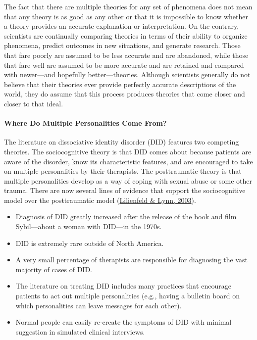 \documentclass[
]{krantz}
\providecommand{\tightlist}{%
  \setlength{\itemsep}{0pt}\setlength{\parskip}{0pt}}
\begin{document}
The fact that there are multiple theories for any set of phenomena does not mean that any theory is as good as any other or that it is impossible to know whether a theory provides an accurate explanation or interpretation. On the contrary, scientists are continually comparing theories in terms of their ability to organize phenomena, predict outcomes in new situations, and generate research. Those that fare poorly are assumed to be less accurate and are abandoned, while those that fare well are assumed to be more accurate and are retained and compared with newer---and hopefully better---theories. Although scientists generally do not believe that their theories ever provide perfectly accurate descriptions of the world, they do assume that this process produces theories that come closer and closer to that ideal.

\hypertarget{where-do-multiple-personalities-come-from}{%
\paragraph*{Where Do Multiple Personalities Come From?}\label{where-do-multiple-personalities-come-from}}

The literature on dissociative identity disorder (DID) features two competing theories. The sociocognitive theory is that DID comes about because patients are aware of the disorder, know its characteristic features, and are encouraged to take on multiple personalities by their therapists. The posttraumatic theory is that multiple personalities develop as a way of coping with sexual abuse or some other trauma. There are now several lines of evidence that support the sociocognitive model over the posttraumatic model (\protect\hyperlink{ref-lilienfeld2003dissociative}{Lilienfeld \& Lynn, 2003}).

\begin{itemize}
\tightlist
\item
  Diagnosis of DID greatly increased after the release of the book and film Sybil---about a woman with DID---in the 1970s.
\item
  DID is extremely rare outside of North America.
\item
  A very small percentage of therapists are responsible for diagnosing the vast majority of cases of DID.
\item
  The literature on treating DID includes many practices that encourage patients to act out multiple personalities (e.g., having a bulletin board on which personalities can leave messages for each other).
\item
  Normal people can easily re-create the symptoms of DID with minimal suggestion in simulated clinical interviews.
\end{itemize}
\end{document}
